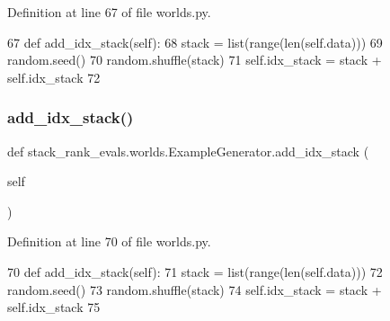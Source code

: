 Definition at line 67 of file worlds.\+py.


\begin{DoxyCode}
67     \textcolor{keyword}{def }add\_idx\_stack(self):
68         stack = list(range(len(self.data)))
69         random.seed()
70         random.shuffle(stack)
71         self.idx\_stack = stack + self.idx\_stack
72 
\end{DoxyCode}
\mbox{\label{classstack__rank__evals_1_1worlds_1_1ExampleGenerator_a9bc7f39d14003d695ad66b624607dc05}} 
\subsubsection{\texorpdfstring{add\+\_\+idx\+\_\+stack()}{add\_idx\_stack()}\hspace{0.1cm}{\footnotesize\ttfamily [2/2]}}
{\footnotesize\ttfamily def stack\+\_\+rank\+\_\+evals.\+worlds.\+Example\+Generator.\+add\+\_\+idx\+\_\+stack (\begin{DoxyParamCaption}\item[{}]{self }\end{DoxyParamCaption})}



Definition at line 70 of file worlds.\+py.


\begin{DoxyCode}
70     \textcolor{keyword}{def }add\_idx\_stack(self):
71         stack = list(range(len(self.data)))
72         random.seed()
73         random.shuffle(stack)
74         self.idx\_stack = stack + self.idx\_stack
75 
\end{DoxyCode}
\mbox{\label{classstack__rank__evals_1_1worlds_1_1ExampleGenerator_ae50d35087dd679c73aa8f5354845199f}} 

